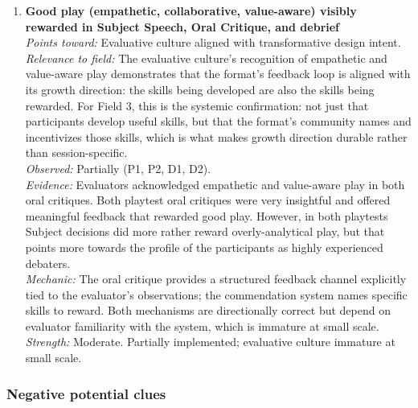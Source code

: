 \begin{enumerate}
\item \textbf{Good play (empathetic, collaborative, value-aware) visibly rewarded in Subject Speech, Oral Critique, and debrief}\\
\textit{Points toward:} Evaluative culture aligned with transformative design intent.\\
\textit{Relevance to field:} The evaluative culture's recognition of empathetic and value-aware play demonstrates that the format's feedback loop is aligned with its growth direction: the skills being developed are also the skills being rewarded. For Field 3, this is the systemic confirmation: not just that participants develop useful skills, but that the format's community names and incentivizes those skills, which is what makes growth direction durable rather than session-specific.\\
\textit{Observed:} Partially (P1, P2, D1, D2).\\
\textit{Evidence:} Evaluators acknowledged empathetic and value-aware play in both oral critiques. Both playtest oral critiques were very insightful and offered meaningful feedback that rewarded good play. However, in both playtests Subject decisions did more rather reward overly-analytical play, but that points more towards the profile of the participants as highly experienced debaters.\\
\textit{Mechanic:} The oral critique provides a structured feedback channel explicitly tied to the evaluator's observations; the commendation system names specific skills to reward. Both mechanisms are directionally correct but depend on evaluator familiarity with the system, which is immature at small scale.\\
\textit{Strength:} Moderate. Partially implemented; evaluative culture immature at small scale.

\end{enumerate}

\subsubsection*{Negative potential clues}


